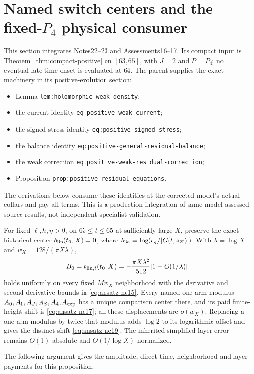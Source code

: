 \section[Named switch centers and the fixed-P4 physical consumer]{Named switch centers and the fixed-$P_4$ physical consumer}
\label{sec:switch-consumer}
This section integrates Notes22--23 \cite{ansatz22,ansatz23} and
Assessments16--17. Its compact input is Theorem~\ref{thm:compact-positive}
on $[63,65]$, with $J=2$ and $P=P_4$; no eventual late-time onset
is evaluated at $64$. The parent \cite{parent} supplies the exact
machinery in its positive-evolution section:
\begin{itemize}
\setlength{\itemsep}{0pt}
\item Lemma \texttt{lem:holomorphic-weak-density};
\item the current identity \texttt{eq:positive-weak-current};
\item the signed stress identity \texttt{eq:positive-signed-stress};
\item the balance identity \texttt{eq:positive-general-residual-balance};
\item the weak correction \texttt{eq:positive-weak-residual-correction};
\item Proposition \texttt{prop:positive-residual-equations}.
\end{itemize}
The derivations below consume these identities at the corrected
model's actual collars and pay all terms. This is a production
integration of same-model assessed source results, not independent
specialist validation.

\begin{proposition}
\label{prop:named-switch-centres}
For fixed $\ell,h,\eta>0$, on $63\le t\le65$ at sufficiently large
$X$, preserve the exact historical center
$b_{\rm lin}(t_0,X)=0$, where
$b_{\rm lin}=\log(\epsilon_g/|G(t,s_X)|)$. With
$\lambda=\log X$ and $w_X=128/(\pi X\lambda)$,
\[
 B_0=b_{{\rm lin},t}(t_0,X)
 =-\frac{\pi X\lambda^2}{512}[1+O(1/\lambda)]
\]
holds uniformly on every fixed $Mw_X$ neighborhood with the derivative
and second-derivative bounds in \eqref{eq:ansatz-nc15}. Every named
one-arm modulus $A_0,A_1,A_J,A_S,A_4,A_{\rm exp}$ has a unique
comparison center there, and its paid finite-height shift is
\eqref{eq:ansatz-nc17}; all these displacements are $o(w_X)$.
Replacing a one-arm modulus by twice that modulus adds $\log2$ to
its logarithmic offset and gives the distinct shift
\eqref{eq:ansatz-nc19}. The inherited simplified-layer error remains
$O(1)$ absolute and $O(1/\log X)$ normalized.
\end{proposition}
The following argument gives the amplitude, direct-time, neighborhood
and layer payments for this proposition.

